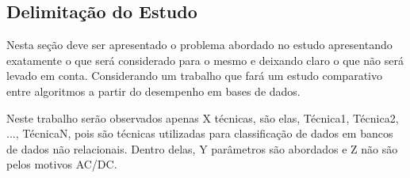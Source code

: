 

\subsection{\textbf{Delimitação do Estudo}}
    \label{sec:delimitacao-estudo}
    
    Nesta seção deve ser apresentado o problema abordado no estudo apresentando exatamente o que será considerado para o mesmo e deixando claro o que não será levado em conta. Considerando um trabalho que fará um estudo comparativo entre algoritmos a partir do desempenho em bases de dados.
    
    Neste trabalho serão observados apenas X técnicas, são elas, Técnica1, Técnica2, ..., TécnicaN, pois são técnicas utilizadas para classificação de dados em bancos de dados não relacionais. Dentro delas, Y parâmetros são abordados e Z não são pelos motivos AC/DC.
    
